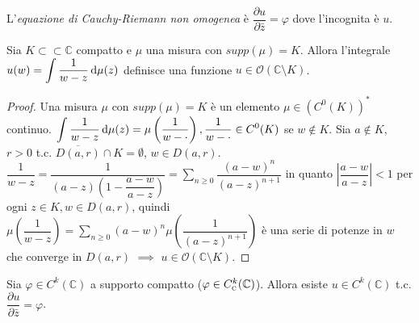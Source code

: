 \begin{defn}
  L'\textit{equazione di Cauchy-Riemann non omogenea} è $\dfrac{\partial u}{\partial\bar{z}}=\varphi$ dove l'incognita è $u$.
\end{defn}

\begin{lm} \label{misura}
  Sia $K \subset\subset \mathbb{C}$ compatto e $\mu$ una misura con $supp(\mu)=K$. Allora l'integrale $\displaystyle u(w)=\int \dfrac{1}{w-z}\mathop{}\!\mathrm{d}\mu(z)$ definisce una funzione $u \in \mathcal{O}(\mathbb{C}\setminus K)$.
\end{lm}

\begin{proof}
  Una misura $\mu$ con $supp(\mu)=K$ è un elemento $\mu \in (C^0(K))^*$ continuo. $\displaystyle \int \dfrac{1}{w-z} \mathop{}\!\mathrm{d}\mu(z)=\mu\left(\dfrac{1}{w-\cdot}\right), \dfrac{1}{w-\cdot} \in C^0(K)$ se $w\not\in K$.
  Sia $a \not\in K$, $r>0$ t.c. $\overline{D(a, r)}\cap K=\emptyset$, $w \in D(a, r)$.
  $\displaystyle \dfrac{1}{w-z}=\dfrac{1}{(a-z)\left(1-\dfrac{a-w}{a-z}\right)}=\sum_{n \ge 0} \dfrac{(a-w)^n}{(a-z)^{n+1}}$ in quanto $\left|\dfrac{a-w}{a-z}\right|<1$ per ogni $z \in K, w \in D(a, r)$, quindi $\displaystyle \mu\left(\dfrac{1}{w-z}\right)=\sum_{n\ge 0} (a-w)^n\mu\left(\dfrac{1}{(a-z)^{n+1}}\right)$ è una serie di potenze in $w$ che converge in $D(a,r)$ $\implies$ $u \in \mathcal{O}(\mathbb{C}\setminus K)$.
\end{proof}

\begin{thm}
  Sia $\varphi \in C^k(\mathbb{C})$ a supporto compatto ($\varphi \in C^k_{\text{\textsc{c}}}(\mathbb{C})$). Allora esiste $u \in C^k(\mathbb{C})$ t.c. $\dfrac{\partial u}{\partial\bar{z}}=\varphi$.
\end{thm}

